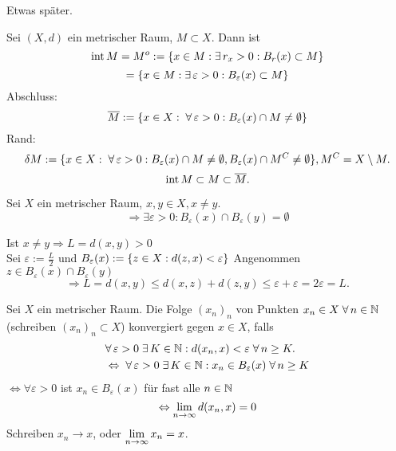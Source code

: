 \documentclass[../ana2.tex]{subfiles}
\begin{document}
\begin{bew}
    Etwas später.
\end{bew}
\begin{defi}
    Sei \( (X, d) \) ein metrischer Raum, \( M \subset X \).
    Dann ist 
    \[ \inner M = M^o 
    := \set{x \in M: \exists r_x > 0: B_r(x)\subset M}\]
    \[= \set{x \in M: \exists \varepsilon > 0: 
    B_\varepsilon(x) \subset M }\]
    Abschluss:
    \[ \overline{M} := 
    \set{x \in X: \; \forall \varepsilon > 0: 
    B_\varepsilon(x) \cap M \neq \emptyset} \]
    Rand: 
    \[ \delta M := \set{ x \in X: \; \forall \varepsilon > 0: 
    B_\varepsilon(x) \cap M \neq \emptyset, 
    B_\varepsilon(x) \cap M^C \neq \emptyset },
    M^C = X \setminus M. \]
    \[ \operatorname{int} M \subset M \subset \overline{M}. \]
\end{defi}
\begin{lem}
    Sei \( X \) ein metrischer Raum, 
    \( x,y \in X, x\neq y \). 
    \[ \Rightarrow \exists \varepsilon > 0: 
    B_\varepsilon(x) \cap B_\varepsilon(y) = \emptyset \]
\end{lem}
\begin{bew}
    Ist \(x \neq y \Rightarrow L = d(x,y) > 0 \) \\
    Sei \( \varepsilon := \frac{L}{2} \) und 
    \( B_\varepsilon(x) := \{z \in X: d(z,x) < \varepsilon\} \)
    Angenommen \( z \in B_\varepsilon(x) \cap 
    B_\varepsilon(y) \)
    \[ \Rightarrow L = d(x,y) 
    \leq d(x,z) + d(z,y) 
    \leq \varepsilon + \varepsilon = 2\varepsilon = L. \]
\end{bew}
\begin{defi}[Konvergenz]
    Sei \( X \) ein metrischer Raum. Die Folge 
    \( (x_n)_n \) von Punkten \( x_n \in X \; \forall n\in\N \)
    (schreiben \( (x_n)_n \subset X \)) konvergiert 
    gegen \( x \in X \), falls 
    \begin{align*}
        &\forall \varepsilon > 0 \; \exists K \in \N: 
        d(x_n, x) < \varepsilon \;\forall n \geq K. \\
        &\Leftrightarrow \; \forall \varepsilon > 0 
        \; \exists K \in \N: x_n \in B_\varepsilon(x) 
        \; \forall n \geq K 
    \end{align*}
    \( \Leftrightarrow \forall \varepsilon > 0  \) 
    ist \( x_n \in B_\varepsilon(x) \) für fast alle 
    \( n\in\mathbb{N} \)
    \[ \Leftrightarrow \lim\limits_{n\rightarrow\infty} d(x_n, x) = 0 \]
    Schreiben \( x_n \rightarrow x \), oder 
    \( \lim\limits_{n\rightarrow\infty} x_n = x \).
\end{defi}
\end{document}
